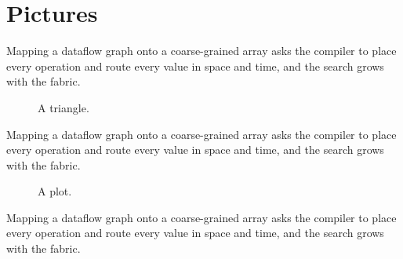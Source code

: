 \documentclass{article}
\begin{document}
\section{Pictures}
Mapping a dataflow graph onto a coarse-grained array asks the compiler to place every operation and route every value in space and time, and the search grows with the fabric.

\begin{figure}[h]\centering
{}
\caption{A triangle.}\label{fig:t}\end{figure}
Mapping a dataflow graph onto a coarse-grained array asks the compiler to place every operation and route every value in space and time, and the search grows with the fabric.

\begin{figure}[h]\centering
{}
\caption{A plot.}\label{fig:plot}\end{figure}
Mapping a dataflow graph onto a coarse-grained array asks the compiler to place every operation and route every value in space and time, and the search grows with the fabric.
\end{document}
